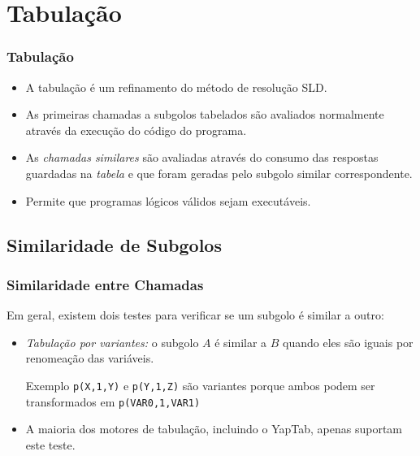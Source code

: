 \documentclass{beamer}
\begin{document}
\section{Tabulação}

\begin{frame}
    \frametitle{Tabulação}
    \begin{itemize}
       \item A tabulação é um refinamento do método de resolução SLD.
       \item As primeiras chamadas a subgolos tabelados são avaliados normalmente através da execução do código do
       programa.
       \item As \emph{chamadas similares} são avaliadas através do consumo das respostas guardadas na \emph{tabela}
       e que foram geradas pelo subgolo similar correspondente.
       \item Permite que programas lógicos válidos sejam executáveis.
    \end{itemize}
\end{frame}

\subsection{Similaridade de Subgolos}

\begin{frame}
   \frametitle{Similaridade entre Chamadas}
   Em geral, existem dois testes para verificar se um subgolo é similar a outro:
   \begin{itemize}
      \item \emph{Tabulação por variantes:} o subgolo $A$ é similar a $B$ quando eles são iguais por renomeação das variáveis.
      \pause
      \begin{block}{Exemplo}
         \texttt{p(X,1,Y)} e \texttt{p(Y,1,Z)} são variantes porque ambos podem ser transformados em \texttt{p(VAR0,1,VAR1)}
      \end{block}
      \pause
      \item A maioria dos motores de tabulação, incluindo o YapTab, apenas suportam este teste.
   \end{itemize}
\end{frame}
\end{document}
